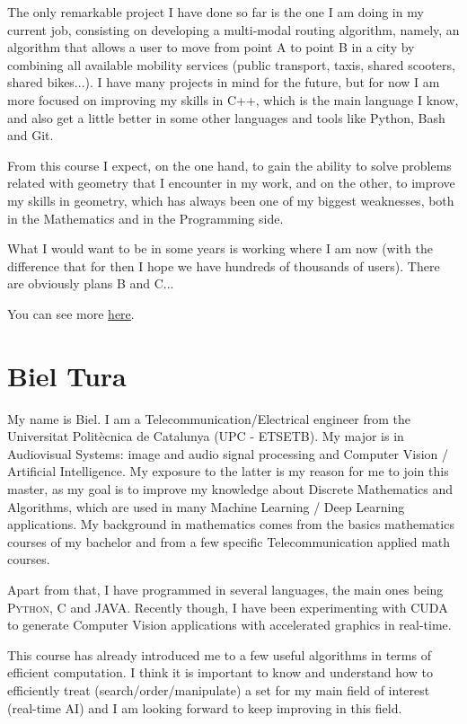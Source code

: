 \documentclass[11pt]{amsart}
\begin{document}
The only remarkable project I have done so far is the one I am doing in my current job, consisting on developing a multi-modal routing algorithm, namely, an algorithm that allows a user to move from point A to point B in a city by combining all available mobility services (public transport, taxis, shared scooters, shared bikes...). I have many projects in mind for the future, but for now I am more focused on improving my skills in C++, which is the main language I know, and also get a little better in some other languages and tools like Python, Bash and Git.

From this course I expect, on the one hand, to gain the ability to solve problems related with geometry that I encounter in my work, and on the other, to improve my skills in geometry, which has always been one of my biggest weaknesses, both in the Mathematics and in the Programming side.

What I would want to be in some years is working where I am now (with the difference that for then I hope we have hundreds of thousands of users). There are obviously plans B and C...

You can see more \href{https://www.linkedin.com/in/victormartinchabrera}{here}.

\medskip

\section*{Biel Tura}
My name is Biel. I am a Telecommunication/Electrical engineer from the Universitat Politècnica de Catalunya (UPC - ETSETB). My major is in Audiovisual Systems: image and audio signal processing and Computer Vision / Artificial Intelligence. My exposure to the latter is my reason for me to join this master, as my goal is to improve my knowledge about Discrete Mathematics and Algorithms, which are used in many Machine Learning / Deep Learning applications. My background in mathematics comes from the basics mathematics courses of my bachelor and from a few specific Telecommunication applied math courses.

Apart from that, I have programmed in several languages, the main ones being \textsc{Python}, \textsc{C} and \textsc{JAVA}. Recently though, I have been experimenting with \textsc{CUDA} to generate Computer Vision applications with accelerated graphics in real-time.

This course has already introduced me to a few useful algorithms in terms of efficient computation. I think it is important to know and understand how to efficiently treat (search/order/manipulate) a set for my main field of interest (real-time AI) and I am looking forward to keep improving in this field.
\end{document}

